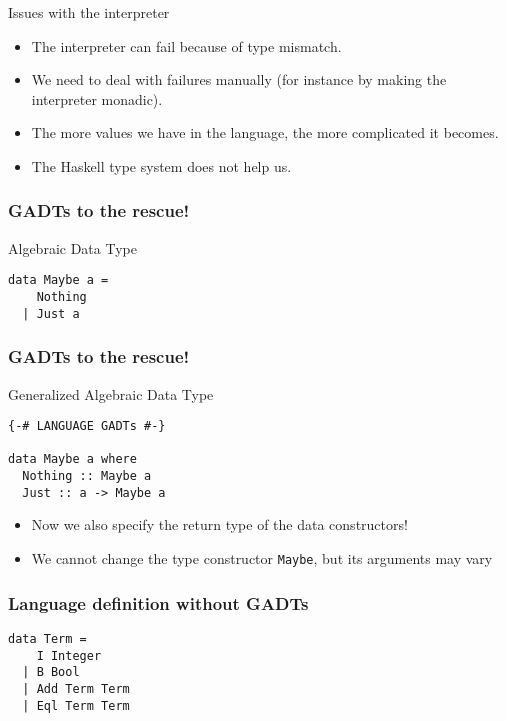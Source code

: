 \documentclass[pdftex,aspectratio=169]{beamer}
\begin{document}
\begin{frame}{Issues with the interpreter}
  \begin{itemize}[<+->]
\item The interpreter can fail because of type mismatch.
\item We need to deal with failures manually (for instance by making
  the interpreter monadic).
\item The more values we have in the language, the more complicated it becomes.
\item The Haskell type system does not help us.
\end{itemize}
\end{frame}

\begin{frame}[fragile]
  \frametitle{GADTs to the rescue!}

  \begin{block}{Algebraic Data Type}
    \begin{lstlisting}
data Maybe a =
    Nothing
  | Just a
\end{lstlisting}

  \end{block}
\end{frame}

\begin{frame}[fragile]
  \frametitle{GADTs to the rescue!}

  \begin{block}{Generalized Algebraic Data Type}
    \begin{lstlisting}
{-# LANGUAGE GADTs #-}

data Maybe a where
  Nothing :: Maybe a
  Just :: a -> Maybe a
\end{lstlisting}

  \end{block}\pause
  \begin{itemize}
  \item Now we also specify the return type of the data constructors!
  \item We cannot change the type constructor \lstinline{Maybe}, but
    its arguments may vary
  \end{itemize}
\end{frame}

\begin{frame}[fragile]
  \frametitle{Language definition without GADTs}
  \begin{block}{}
    \begin{lstlisting}
data Term =
    I Integer
  | B Bool
  | Add Term Term
  | Eql Term Term      
    \end{lstlisting}
  \end{block}
\end{frame}
\end{document}
